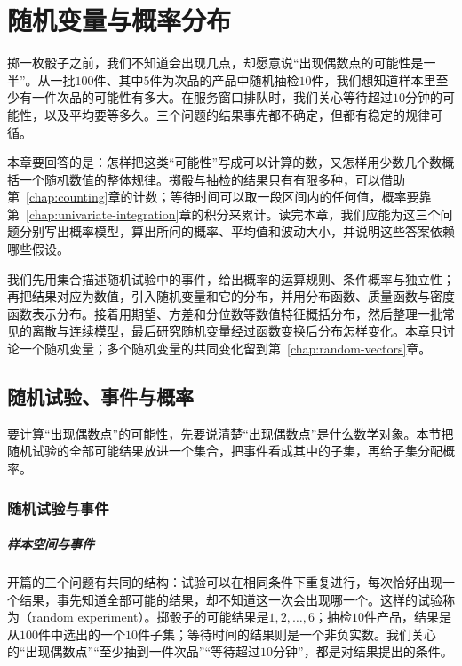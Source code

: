 \chapter{随机变量与概率分布}
\label{chap:random-variables}

掷一枚骰子之前，我们不知道会出现几点，却愿意说“出现偶数点的可能性是一半”。从一批$100$件、其中$5$件为次品的产品中随机抽检$10$件，我们想知道样本里至少有一件次品的可能性有多大。在服务窗口排队时，我们关心等待超过$10$分钟的可能性，以及平均要等多久。三个问题的结果事先都不确定，但都有稳定的规律可循。

本章要回答的是：怎样把这类“可能性”写成可以计算的数，又怎样用少数几个数概括一个随机数值的整体规律。掷骰与抽检的结果只有有限多种，可以借助第~\ref{chap:counting}章的计数；等待时间可以取一段区间内的任何值，概率要靠第~\ref{chap:univariate-integration}章的积分来累计。读完本章，我们应能为这三个问题分别写出概率模型，算出所问的概率、平均值和波动大小，并说明这些答案依赖哪些假设。

我们先用集合描述随机试验中的事件，给出概率的运算规则、条件概率与独立性；再把结果对应为数值，引入随机变量和它的分布，并用分布函数、质量函数与密度函数表示分布。接着用期望、方差和分位数等数值特征概括分布，然后整理一批常见的离散与连续模型，最后研究随机变量经过函数变换后分布怎样变化。本章只讨论一个随机变量；多个随机变量的共同变化留到第~\ref{chap:random-vectors}章。

\section{随机试验、事件与概率}
\label{sec:prob-events}

要计算“出现偶数点”的可能性，先要说清楚“出现偶数点”是什么数学对象。本节把随机试验的全部可能结果放进一个集合，把事件看成其中的子集，再给子集分配概率。

\subsection{随机试验与事件}
\label{sec:prob-experiments-events}

\paragraph{样本空间与事件}
开篇的三个问题有共同的结构：试验可以在相同条件下重复进行，每次恰好出现一个结果，事先知道全部可能的结果，却不知道这一次会出现哪一个。这样的试验称为（random experiment）。掷骰子的可能结果是$1,2,\dots,6$；抽检$10$件产品，结果是从$100$件中选出的一个$10$件子集；等待时间的结果则是一个非负实数。我们关心的“出现偶数点”“至少抽到一件次品”“等待超过$10$分钟”，都是对结果提出的条件。

